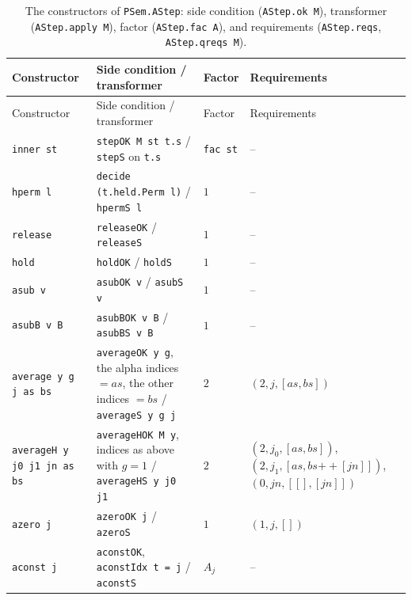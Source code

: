 \begin{xltabular}{\textwidth}{@{}>{\raggedright\arraybackslash}p{3.7cm}>{\raggedright\arraybackslash}X>{\raggedright\arraybackslash}p{1.5cm}>{\raggedright\arraybackslash}p{3.9cm}@{}}
\caption{The constructors of \texttt{PSem.AStep}: side condition (\texttt{AStep.ok M}), transformer
(\texttt{AStep.apply M}), factor (\texttt{AStep.fac A}), and requirements (\texttt{AStep.reqs},
\texttt{AStep.qreqs M}).}\label{tab:lean-pathsum-asteps}\\
\toprule Constructor & Side condition / transformer & Factor & Requirements\\\midrule\endfirsthead
\toprule Constructor & Side condition / transformer & Factor & Requirements\\\midrule\endhead
\textnormal{\texttt{inner st}} & \textnormal{\texttt{stepOK M st t.\allowbreak{}s}} / \textnormal{\texttt{stepS}} on \textnormal{\texttt{t.\allowbreak{}s}} & \textnormal{\texttt{fac st}} & --\\
\textnormal{\texttt{hperm l}} & \textnormal{\texttt{decide (\allowbreak{}t.\allowbreak{}held.\allowbreak{}Perm l)}} / \textnormal{\texttt{hpermS l}} & $1$ & --\\
\textnormal{\texttt{release}} & \textnormal{\texttt{releaseOK}} / \textnormal{\texttt{releaseS}} & $1$ & --\\
\textnormal{\texttt{hold}} & \textnormal{\texttt{holdOK}} / \textnormal{\texttt{holdS}} & $1$ & --\\
\textnormal{\texttt{asub v}} & \textnormal{\texttt{asubOK v}} / \textnormal{\texttt{asubS v}} & $1$ & --\\
\textnormal{\texttt{asubB v B}} & \textnormal{\texttt{asubBOK v B}} / \textnormal{\texttt{asubBS v B}} & $1$ & --\\
\textnormal{\texttt{average y g j as bs}} & \textnormal{\texttt{averageOK y g}}, the alpha indices $=as$, the other indices $=bs$ / \textnormal{\texttt{averageS y g j}} & $2$ & $(2,j,[as,bs])$\\
\textnormal{\texttt{averageH y j0 j1 jn as bs}} & \textnormal{\texttt{averageHOK M y}}, indices as above with $g=1$ / \textnormal{\texttt{averageHS y j0 j1}} & $2$ & $(2,j_0,[as,bs])$, $(2,j_1,[as,bs\mathbin{+\!\!+}[jn]])$, $(0,jn,[[],[jn]])$\\
\textnormal{\texttt{azero j}} & \textnormal{\texttt{azeroOK j}} / \textnormal{\texttt{azeroS}} & $1$ & $(1,j,[])$\\
\textnormal{\texttt{aconst j}} & \textnormal{\texttt{aconstOK}}, \textnormal{\texttt{aconstIdx t = j}} / \textnormal{\texttt{aconstS}} & $A_j$ & --\\

\end{xltabular}

